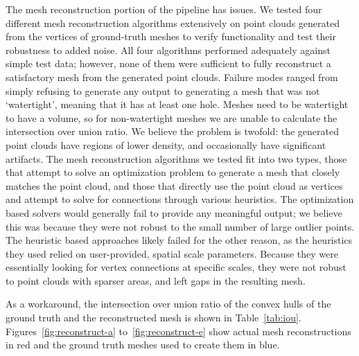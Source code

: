 \documentclass[12pt,letterpaper]{article} %
\begin{document}
The mesh reconstruction portion of the pipeline has issues.  We tested four different mesh reconstruction algorithms extensively on point clouds generated from the vertices of ground-truth meshes to verify functionality and test their robustness to added noise.  All four algorithms performed adequately against simple test data; however, none of them were sufficient to fully reconstruct a satisfactory mesh from the generated point clouds.  Failure modes ranged from simply refusing to generate any output to generating a mesh that was not ‘watertight’, meaning that it has at least one hole.  Meshes need to be watertight to have a volume, so for non-watertight meshes we are unable to calculate the intersection over union ratio.  We believe the problem is twofold: the generated point clouds have regions of lower density, and occasionally have significant artifacts.  The mesh reconstruction algorithms we tested fit into two types, those that attempt to solve an optimization problem to generate a mesh that closely matches the point cloud, and those that directly use the point cloud as vertices and attempt to solve for connections through various heuristics.  The optimization based solvers would generally fail to provide any meaningful output; we believe this was because they were not robust to the small number of large outlier points.  The heuristic based approaches likely failed for the other reason, as the heuristics they used relied on user-provided, spatial scale parameters.  Because they were essentially looking for vertex connections at specific scales, they were not robust to point clouds with sparser areas, and left gaps in the resulting mesh.

As a workaround, the intersection over union ratio of the convex hulls of the ground truth and the reconstructed mesh is shown in Table~\ref{tab:iou}.  Figures~\ref{fig:reconstruct-a} to~\ref{fig:reconstruct-e} show actual mesh reconstructions in red and the ground truth meshes used to create them in blue.
\end{document}
